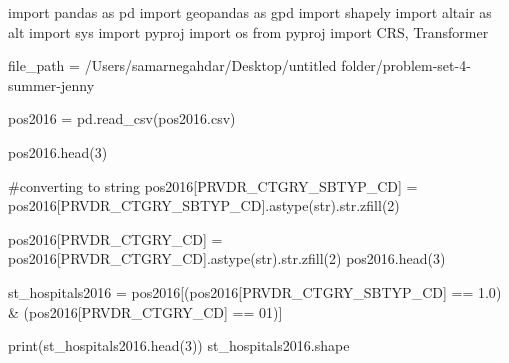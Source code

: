 \documentclass[
  letterpaper,
  DIV=11,
  numbers=noendperiod]{scrartcl}
\newenvironment{Shaded}{\begin{snugshade}}{\end{snugshade}}
\newcommand{\BuiltInTok}[1]{\textcolor[rgb]{0.00,0.23,0.31}{#1}}
\newcommand{\CommentTok}[1]{\textcolor[rgb]{0.37,0.37,0.37}{#1}}
\newcommand{\DecValTok}[1]{\textcolor[rgb]{0.68,0.00,0.00}{#1}}
\newcommand{\ImportTok}[1]{\textcolor[rgb]{0.00,0.46,0.62}{#1}}
\newcommand{\NormalTok}[1]{\textcolor[rgb]{0.00,0.23,0.31}{#1}}
\newcommand{\OperatorTok}[1]{\textcolor[rgb]{0.37,0.37,0.37}{#1}}
\newcommand{\StringTok}[1]{\textcolor[rgb]{0.13,0.47,0.30}{#1}}
\begin{document}
\begin{Shaded}
\begin{Highlighting}[]
\ImportTok{import}\NormalTok{ pandas }\ImportTok{as}\NormalTok{ pd}
\ImportTok{import}\NormalTok{ geopandas }\ImportTok{as}\NormalTok{ gpd}
\ImportTok{import}\NormalTok{ shapely}
\ImportTok{import}\NormalTok{ altair }\ImportTok{as}\NormalTok{ alt}
\ImportTok{import}\NormalTok{ sys}
\ImportTok{import}\NormalTok{ pyproj}
\ImportTok{import}\NormalTok{ os}
\ImportTok{from}\NormalTok{ pyproj }\ImportTok{import}\NormalTok{ CRS, Transformer}

\NormalTok{file\_path }\OperatorTok{=} \StringTok{\textquotesingle{}/Users/samarnegahdar/Desktop/untitled folder/problem{-}set{-}4{-}summer{-}jenny\textquotesingle{}}

\NormalTok{pos2016 }\OperatorTok{=}\NormalTok{ pd.read\_csv(}\StringTok{\textquotesingle{}pos2016.csv\textquotesingle{}}\NormalTok{)}

\NormalTok{pos2016.head(}\DecValTok{3}\NormalTok{)}

\CommentTok{\#converting to string}
\NormalTok{pos2016[}\StringTok{\textquotesingle{}PRVDR\_CTGRY\_SBTYP\_CD\textquotesingle{}}\NormalTok{] }\OperatorTok{=}\NormalTok{ pos2016[}\StringTok{\textquotesingle{}PRVDR\_CTGRY\_SBTYP\_CD\textquotesingle{}}\NormalTok{].astype(}\BuiltInTok{str}\NormalTok{).}\BuiltInTok{str}\NormalTok{.zfill(}\DecValTok{2}\NormalTok{)}

\NormalTok{pos2016[}\StringTok{\textquotesingle{}PRVDR\_CTGRY\_CD\textquotesingle{}}\NormalTok{] }\OperatorTok{=}\NormalTok{ pos2016[}\StringTok{\textquotesingle{}PRVDR\_CTGRY\_CD\textquotesingle{}}\NormalTok{].astype(}\BuiltInTok{str}\NormalTok{).}\BuiltInTok{str}\NormalTok{.zfill(}\DecValTok{2}\NormalTok{)}
\NormalTok{pos2016.head(}\DecValTok{3}\NormalTok{)}

\NormalTok{st\_hospitals2016 }\OperatorTok{=}\NormalTok{ pos2016[(pos2016[}\StringTok{\textquotesingle{}PRVDR\_CTGRY\_SBTYP\_CD\textquotesingle{}}\NormalTok{] }\OperatorTok{==} \StringTok{\textquotesingle{}1.0\textquotesingle{}}\NormalTok{) }\OperatorTok{\&}\NormalTok{ (pos2016[}\StringTok{\textquotesingle{}PRVDR\_CTGRY\_CD\textquotesingle{}}\NormalTok{] }\OperatorTok{==} \StringTok{\textquotesingle{}01\textquotesingle{}}\NormalTok{)]}

\BuiltInTok{print}\NormalTok{(st\_hospitals2016.head(}\DecValTok{3}\NormalTok{))}
\NormalTok{st\_hospitals2016.shape}
\end{Highlighting}
\end{Shaded}
\end{document}
